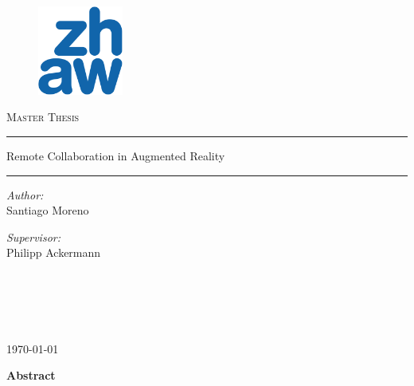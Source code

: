 \documentclass{article}
\title{}
\author{Santiago Moreno}
\date{August 2022}
\begin{document}
\begin{titlepage}
\begin{center}

\begin{figure}
\centering
\includegraphics[width=0.25\textwidth]{img/ZHAW_Logo.png} %
\end{figure}

\vspace*{.06\textheight}
\vspace{1.5cm} 
\textsc{\Large Master Thesis}\\[0.5cm] %

\hrule%
\vspace{0.4cm}
\huge Remote Collaboration in Augmented Reality \vspace{0.4cm} %
\hrule %
\vspace{0.4cm}

\begin{minipage}[t]{0.4\textwidth}
\begin{flushleft} \large
\emph{Author:}\\
Santiago Moreno%
\end{flushleft}
\end{minipage}
\begin{minipage}[t]{0.4\textwidth}
\begin{flushright} \large
\emph{Supervisor:} \\
Philipp Ackermann %
\end{flushright}
\end{minipage}\\[3cm]
 
\vfill

\large \textit{}\\[0.3cm] %
\textit{}\\[2.4cm]

\vfill

{\large \today}\\[4cm] %
 
\vfill
\end{center}
\end{titlepage}
\begin{center}
    \Large
    \textbf{Abstract}
    
\end{center}
\end{document}
